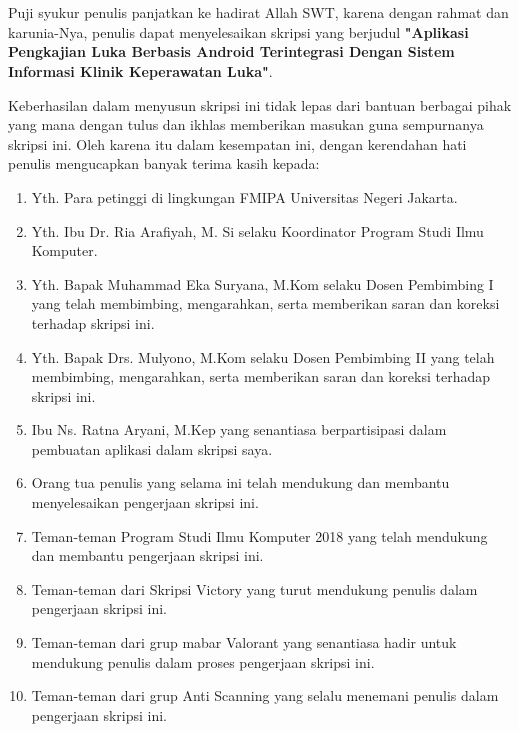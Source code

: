 \chapter*{}

Puji syukur penulis panjatkan ke hadirat Allah SWT, karena dengan rahmat dan karunia-Nya, penulis dapat menyelesaikan skripsi yang berjudul \textbf{"Aplikasi Pengkajian Luka Berbasis Android Terintegrasi Dengan Sistem Informasi Klinik Keperawatan Luka"}.

Keberhasilan dalam menyusun skripsi ini tidak lepas dari bantuan berbagai pihak yang mana dengan tulus dan ikhlas memberikan masukan guna sempurnanya skripsi ini. Oleh karena itu dalam kesempatan ini, dengan kerendahan hati penulis mengucapkan banyak terima kasih kepada:

\begin{enumerate}

	\item{Yth. Para petinggi di lingkungan FMIPA Universitas Negeri Jakarta.}
	\item{Yth. Ibu Dr. Ria Arafiyah, M. Si selaku Koordinator Program Studi Ilmu Komputer.}
	\item{Yth. Bapak Muhammad Eka Suryana, M.Kom selaku Dosen Pembimbing I yang telah membimbing, mengarahkan, serta memberikan saran dan koreksi terhadap skripsi ini.}
	\item{Yth. Bapak Drs. Mulyono, M.Kom selaku Dosen Pembimbing II yang telah membimbing, mengarahkan, serta memberikan saran dan koreksi terhadap skripsi ini.}
	\item{Ibu Ns. Ratna Aryani, M.Kep yang senantiasa berpartisipasi dalam pembuatan aplikasi dalam skripsi saya.}
	\item{Orang tua penulis yang selama ini telah mendukung dan membantu menyelesaikan pengerjaan skripsi ini.}
	\item{Teman-teman Program Studi Ilmu Komputer 2018 yang telah mendukung dan membantu pengerjaan skripsi ini.}
	\item{Teman-teman dari Skripsi Victory yang turut mendukung penulis dalam pengerjaan skripsi ini.}
	\item{Teman-teman dari grup mabar Valorant yang senantiasa hadir untuk mendukung penulis dalam proses pengerjaan skripsi ini.}
	\item{Teman-teman dari grup Anti Scanning yang selalu menemani penulis dalam pengerjaan skripsi ini.}
	
	
\end{enumerate}

